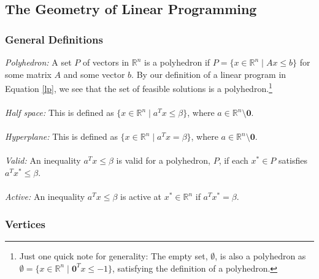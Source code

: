 \documentclass[a4paper,12pt]{scrartcl}
\theoremstyle{definition}
\theoremstyle{remark}
\begin{document}
\newpage
\subsection{The Geometry of Linear Programming}

\subsubsection{General Definitions}

{\sl Polyhedron:}
A set $P$ of vectors in $\mathbb{R}^n$ is a polyhedron
if $P=\{ x\in \mathbb{R}^n \; | \; Ax \leq b \}$ for some matrix $A$
and some vector $b$.  By our definition of a linear program in
Equation \ref{lp}, we see that the set of feasible solutions is
a polyhedron.\footnote{Just one quick note for generality: The empty
set, $\emptyset$, is also a polyhedron as $\emptyset = \{ x \in
\mathbb{R}^n \; |\; \mathbf{0}^T x \leq -1 \}$,
satisfying the definition of a polyhedron.}
\\
\\
{\sl Half space:} This is defined as $\{ x \in \mathbb{R}^n
   \; | \; a^T x \leq \beta \}$, where $a \in \mathbb{R}^n \setminus
   \mathbf{0}$.
\\\\
{\sl Hyperplane:} This is defined as $\{ x \in \mathbb{R}^n
   \; | \; a^T x = \beta \}$, where $a \in \mathbb{R}^n \setminus
   \mathbf{0}$.
\\\\
{\sl Valid:} An inequality $a^T x \leq \beta$ is valid for a
   polyhedron, $P$, if each $x^* \in P$ satisfies $a^T x^* \leq
   \beta$.
\\\\
{\sl Active:} An inequality $a^T x \leq \beta$ is active
   at $x^* \in \mathbb{R}^n$ if $a^T x^* = \beta$.


\subsubsection{Vertices}
\end{document}
